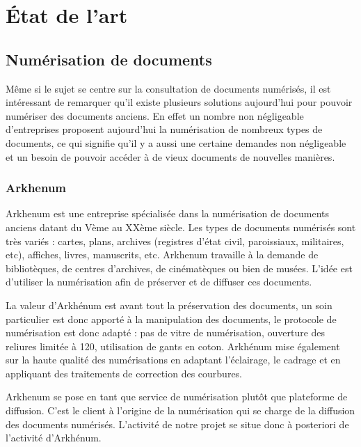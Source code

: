 \section{État de l'art}
\label{sec:etat_art}

    \subsection{Numérisation de documents}
    \label{subsec:numerisation}
    Même si le sujet se centre sur la consultation de documents numérisés, il est intéressant de remarquer qu’il existe plusieurs
    solutions aujourd’hui pour pouvoir numériser des documents anciens. En effet un nombre non négligeable d’entreprises proposent
    aujourd’hui la numérisation de nombreux types de documents, ce qui signifie qu’il y a aussi une certaine demandes non négligeable
    et un besoin de pouvoir accéder à de vieux documents de nouvelles manières.


        \subsubsection{Arkhenum}
        \label{subsubsec:arkhenum}

        Arkhenum est une entreprise spécialisée dans la numérisation de documents anciens
        datant du Vème au XXème siècle. Les types de documents numérisés sont très variés :
        cartes, plans, archives (registres d'état civil, paroissiaux, militaires, etc),
        affiches, livres, manuscrits, etc. Arkhenum travaille à la demande de bibliotèques,
        de centres d'archives, de cinématèques ou bien de musées. L'idée est d'utiliser
        la numérisation afin de préserver et de diffuser ces documents.

        La valeur d'Arkhénum est avant tout la préservation des documents, un soin particulier
        est donc apporté à la manipulation des documents, le protocole de numérisation
        est donc adapté : pas de vitre de numérisation, ouverture des reliures limitée à 120\degree,
        utilisation de gants en coton. Arkhénum mise également sur la haute qualité
        des numérisations en adaptant l'éclairage, le cadrage et en appliquant des traitements
        de correction des courbures.

        Arkhenum se pose en tant que service de numérisation plutôt que plateforme de diffusion.
        C’est le client à l’origine de la numérisation qui se charge de la diffusion
        des documents numérisés. L'activité de notre projet se situe donc à posteriori de l'activité d'Arkhénum.


